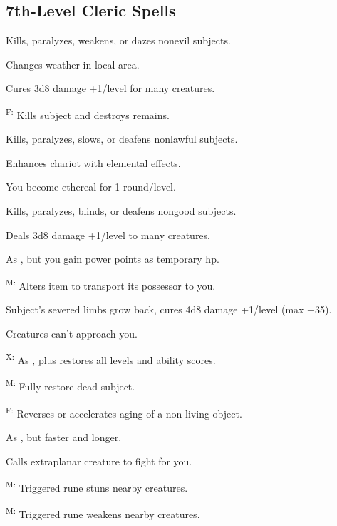 \subsection{7th-Level Cleric Spells}

 Kills, paralyzes, weakens, or dazes nonevil subjects.

 Changes weather in local area.

 Cures 3d8 damage +1/level for many creatures.

\textsuperscript{F:} Kills subject and destroys remains.

 Kills, paralyzes, slows, or deafens nonlawful subjects.

 Enhances chariot with elemental effects. %

 You become ethereal for 1 round/level.

 Kills, paralyzes, blinds, or deafens nongood subjects.

 Deals 3d8 damage +1/level to many creatures.

 As , but you gain power points as temporary hp.

\textsuperscript{M:} Alters item to transport its possessor to you.

 Subject's severed limbs grow back, cures 4d8 damage +1/level (max +35).

 Creatures can't approach you.

\textsuperscript{X:} As , plus restores all levels and ability scores.

\textsuperscript{M:} Fully restore dead subject.

\textsuperscript{F:} Reverses or accelerates aging of a non-living object. %

 As , but faster and longer.

 Calls extraplanar creature to fight for you.

\textsuperscript{M:} Triggered rune stuns nearby creatures.

\textsuperscript{M:} Triggered rune weakens nearby creatures.

